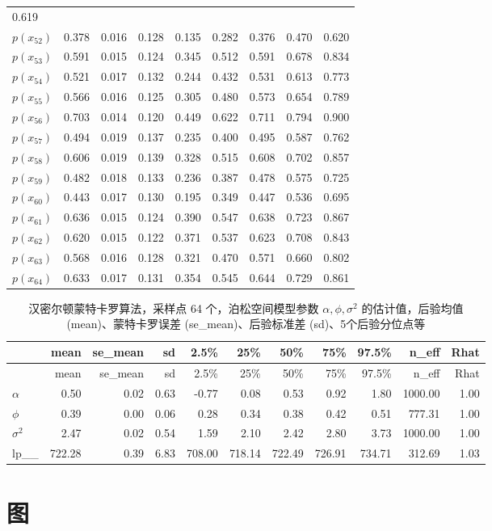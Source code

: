 \documentclass[12pt,a4paper,UTF8,twoside]{book}
\theoremstyle{definition}
\theoremstyle{definition}
\theoremstyle{definition}
\theoremstyle{remark}
\begin{document}
\begin{longtable}[]{@{}lrrrrrrrr@{}}
0.619\tabularnewline
\(p(x_{52})\) & 0.378 & 0.016 & 0.128 & 0.135 & 0.282 & 0.376 & 0.470 &
0.620\tabularnewline
\(p(x_{53})\) & 0.591 & 0.015 & 0.124 & 0.345 & 0.512 & 0.591 & 0.678 &
0.834\tabularnewline
\(p(x_{54})\) & 0.521 & 0.017 & 0.132 & 0.244 & 0.432 & 0.531 & 0.613 &
0.773\tabularnewline
\(p(x_{55})\) & 0.566 & 0.016 & 0.125 & 0.305 & 0.480 & 0.573 & 0.654 &
0.789\tabularnewline
\(p(x_{56})\) & 0.703 & 0.014 & 0.120 & 0.449 & 0.622 & 0.711 & 0.794 &
0.900\tabularnewline
\(p(x_{57})\) & 0.494 & 0.019 & 0.137 & 0.235 & 0.400 & 0.495 & 0.587 &
0.762\tabularnewline
\(p(x_{58})\) & 0.606 & 0.019 & 0.139 & 0.328 & 0.515 & 0.608 & 0.702 &
0.857\tabularnewline
\(p(x_{59})\) & 0.482 & 0.018 & 0.133 & 0.236 & 0.387 & 0.478 & 0.575 &
0.725\tabularnewline
\(p(x_{60})\) & 0.443 & 0.017 & 0.130 & 0.195 & 0.349 & 0.447 & 0.536 &
0.695\tabularnewline
\(p(x_{61})\) & 0.636 & 0.015 & 0.124 & 0.390 & 0.547 & 0.638 & 0.723 &
0.867\tabularnewline
\(p(x_{62})\) & 0.620 & 0.015 & 0.122 & 0.371 & 0.537 & 0.623 & 0.708 &
0.843\tabularnewline
\(p(x_{63})\) & 0.568 & 0.016 & 0.128 & 0.321 & 0.470 & 0.571 & 0.660 &
0.802\tabularnewline
\(p(x_{64})\) & 0.633 & 0.017 & 0.131 & 0.354 & 0.545 & 0.644 & 0.729 &
0.861\tabularnewline
\bottomrule
\end{longtable}

\begin{longtable}[]{@{}lrrrrrrrrrr@{}}
\caption{\label{tab:HMC-Pois-SGLMM} 汉密尔顿蒙特卡罗算法，采样点 64
个，泊松空间模型参数 \(\alpha,\phi,\sigma^2\)
的估计值，后验均值(mean)、蒙特卡罗误差 (se\_mean)、后验标准差
(sd)、5个后验分位点等}\tabularnewline
\toprule
& mean & se\_mean & sd & 2.5\% & 25\% & 50\% & 75\% & 97.5\% & n\_eff &
Rhat\tabularnewline
\midrule
\endfirsthead
\toprule
& mean & se\_mean & sd & 2.5\% & 25\% & 50\% & 75\% & 97.5\% & n\_eff &
Rhat\tabularnewline
\midrule
\endhead
\(\alpha\) & 0.50 & 0.02 & 0.63 & -0.77 & 0.08 & 0.53 & 0.92 & 1.80 &
1000.00 & 1.00\tabularnewline
\(\phi\) & 0.39 & 0.00 & 0.06 & 0.28 & 0.34 & 0.38 & 0.42 & 0.51 &
777.31 & 1.00\tabularnewline
\(\sigma^2\) & 2.47 & 0.02 & 0.54 & 1.59 & 2.10 & 2.42 & 2.80 & 3.73 &
1000.00 & 1.00\tabularnewline
lp\_\_ & 722.28 & 0.39 & 6.83 & 708.00 & 718.14 & 722.49 & 726.91 &
734.71 & 312.69 & 1.03\tabularnewline
\bottomrule
\end{longtable}

\hypertarget{simulate-plot}{%
\section*{图}\label{simulate-plot}}
\end{document}
